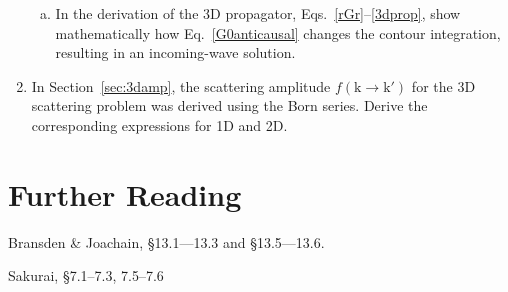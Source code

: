 \documentclass[pra,12pt]{revtex4-2}
\begin{document}
\begin{enumerate}
\begin{enumerate}[(a)]
\item  In the derivation of the 3D propagator,
  Eqs.~\eqref{rGr}--\eqref{3dprop}, show mathematically how
  Eq.~\eqref{G0anticausal} changes the contour integration, resulting
  in an incoming-wave solution.
  \end{enumerate}

\item In Section~\ref{sec:3damp}, the scattering amplitude
  $f(\mathrm{k}\rightarrow\mathrm{k}')$ for the 3D scattering problem
  was derived using the Born series.  Derive the corresponding
  expressions for 1D and 2D.
\end{enumerate}

\section*{Further Reading}

\begin{enumerate}[[1{]}]
\item Bransden \& Joachain, \S13.1---13.3 and \S13.5---13.6.
\item Sakurai, \S7.1--7.3, 7.5--7.6
\end{enumerate}
\end{document}
